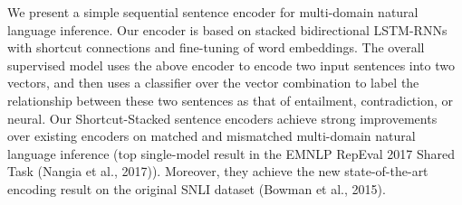 We present a simple sequential sentence encoder for multi-domain natural language inference. Our encoder is based on stacked bidirectional LSTM-RNNs with shortcut connections and fine-tuning of word embeddings. The overall supervised model uses the above encoder to encode two input sentences into two vectors, and then uses a classifier over the vector combination to label the relationship between these two sentences as that of entailment, contradiction, or neural. Our Shortcut-Stacked sentence encoders achieve strong improvements over existing encoders on matched and mismatched multi-domain natural language inference (top single-model result in the EMNLP RepEval 2017 Shared Task (Nangia et al., 2017)). Moreover, they achieve the new state-of-the-art encoding result on the original SNLI dataset (Bowman et al., 2015).
